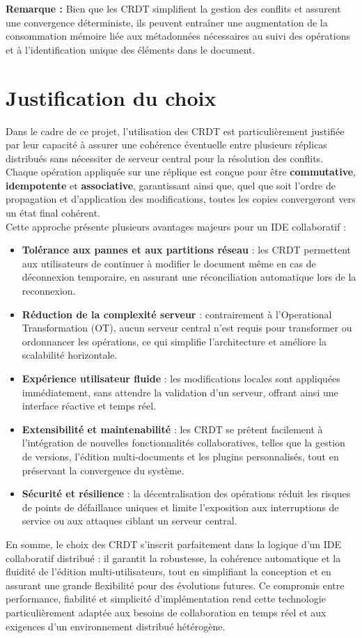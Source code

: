 \documentclass[a4paper,oneside,12pt]{book}
\begin{document}
\noindent
\textbf{Remarque :} Bien que les CRDT simplifient la gestion des conflits et assurent une convergence déterministe, ils peuvent entraîner une augmentation de la consommation mémoire liée aux métadonnées nécessaires au suivi des opérations et à l’identification unique des éléments dans le document.
\section{Justification du choix}

Dans le cadre de ce projet, l’utilisation des CRDT est particulièrement justifiée par leur capacité à assurer une cohérence éventuelle entre plusieurs réplicas distribués sans nécessiter de serveur central pour la résolution des conflits. Chaque opération appliquée sur une réplique est conçue pour être \textbf{commutative}, \textbf{idempotente} et \textbf{associative}, garantissant ainsi que, quel que soit l’ordre de propagation et d’application des modifications, toutes les copies convergeront vers un état final cohérent.\\

Cette approche présente plusieurs avantages majeurs pour un IDE collaboratif :  

\begin{itemize}
	\item[-] \textbf{Tolérance aux pannes et aux partitions réseau} : les CRDT permettent aux utilisateurs de continuer à modifier le document même en cas de déconnexion temporaire, en assurant une réconciliation automatique lors de la reconnexion.
	\item[-] \textbf{Réduction de la complexité serveur} : contrairement à l’Operational Transformation (OT), aucun serveur central n’est requis pour transformer ou ordonnancer les opérations, ce qui simplifie l’architecture et améliore la scalabilité horizontale.
	\item[-] \textbf{Expérience utilisateur fluide} : les modifications locales sont appliquées immédiatement, sans attendre la validation d’un serveur, offrant ainsi une interface réactive et temps réel.
	\item[-] \textbf{Extensibilité et maintenabilité} : les CRDT se prêtent facilement à l’intégration de nouvelles fonctionnalités collaboratives, telles que la gestion de versions, l’édition multi-documents et les plugins personnalisés, tout en préservant la convergence du système.
	\item[-] \textbf{Sécurité et résilience} : la décentralisation des opérations réduit les risques de points de défaillance uniques et limite l’exposition aux interruptions de service ou aux attaques ciblant un serveur central.
\end{itemize}
En somme, le choix des CRDT s’inscrit parfaitement dans la logique d’un IDE collaboratif distribué : il garantit la robustesse, la cohérence automatique et la fluidité de l’édition multi-utilisateurs, tout en simplifiant la conception et en assurant une grande flexibilité pour des évolutions futures. Ce compromis entre performance, fiabilité et simplicité d’implémentation rend cette technologie particulièrement adaptée aux besoins de collaboration en temps réel et aux exigences d’un environnement distribué hétérogène.
\end{document}
